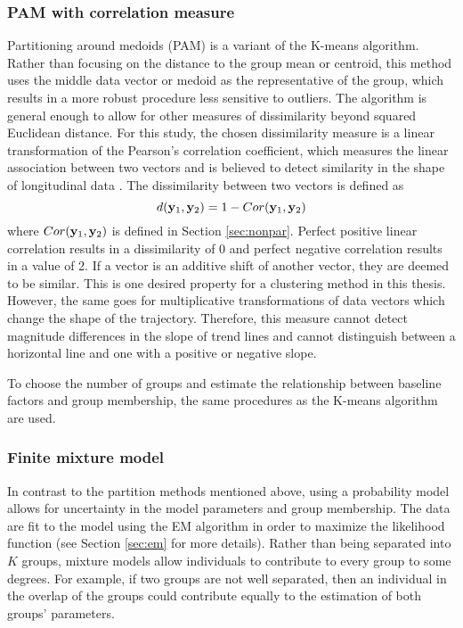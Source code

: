 \subsubsection{PAM with correlation measure}
Partitioning around medoids (PAM) is a variant of the K-means algorithm. Rather than focusing on the distance to the  group mean or centroid, this method uses the middle data vector or medoid as the representative of the group, which results in a more robust procedure less sensitive to outliers. The algorithm is general enough to allow for other measures of dissimilarity beyond squared Euclidean distance. For this study, the chosen dissimilarity measure is a linear transformation of the Pearson's correlation coefficient, which measures the linear association between two vectors and is believed to detect similarity in the shape of longitudinal data \cite{chouakria2007,  eisen1998,chiou2008}. The dissimilarity between two vectors is defined as
$$d(\mathbf y_{1},\mathbf y_{2}) = 1-Cor(\mathbf y_{1},\mathbf y_{2})$$
where $Cor(\mathbf y_{1},\mathbf y_{2})$ is defined in Section \ref{sec:nonpar}. Perfect positive linear correlation results in a dissimilarity of 0 and perfect negative correlation results in a value of 2. If a vector is an additive shift of another vector, they are deemed to be similar. This is one desired property for a clustering method in this thesis. However, the same goes for multiplicative transformations of data vectors which change the shape of the trajectory. Therefore, this measure cannot detect magnitude differences in the slope of trend lines and cannot distinguish between a horizontal line and one with a positive or negative slope.

To choose the number of groups and estimate the relationship between baseline factors and group membership, the same procedures as the K-means algorithm are used.

\subsubsection{Finite mixture model}
In contrast to the partition methods mentioned above, using a probability model allows for uncertainty in the model parameters and group membership. The data are fit to the model using the EM algorithm in order to maximize the likelihood function (see Section \ref{sec:em} for more details). Rather than being separated into $K$ groups, mixture models allow individuals to contribute to every group to some degrees. For example, if two groups are not well separated, then an individual in the overlap of the groups could contribute equally to the estimation of both groups' parameters. 


